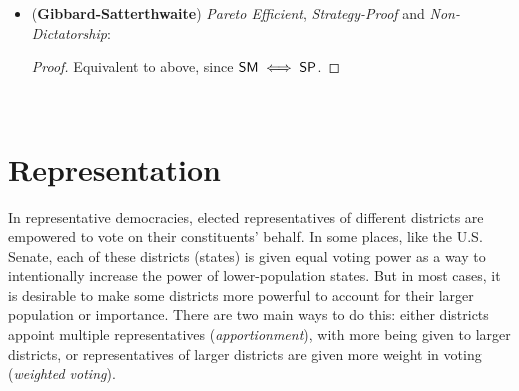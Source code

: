 \documentclass{amsart}
\DeclareMathOperator{\SP}{\sf{SP}}
\DeclareMathOperator{\SM}{\sf{SM}}
\begin{document}
\begin{itemize}
\begin{proof}
		Now using these consequences of $\SM$, we can establish dictatorship fairly easily: take a profile that is on the $(A,B)$-boundary for some $A,B$, and suppose that $v$ is a ballot which has a pivotal swap available. Then without making any swaps of $(A,B)$ one can elevate another candidate $C$ to the top of every ballot other than $v$, leaving the profile still on the $(A,B)$-boundary. Then elevate $C$ in $v$ until it is between $A$ and $B$. This pushes the profile out of the $(A,B)$-boundary, but the winner is still $A$ because this is neutral to $A$. But now, $C$ is unanimously preferred to $B$, \textbf{not done}
		
	\end{proof}
	\item (\textbf{Gibbard-Satterthwaite}) \textit{Pareto Efficient}, \textit{Strategy-Proof} and \textit{Non-Dictatorship}:
	\begin{proof}
		Equivalent to above, since $\SM\iff \SP$.
	\end{proof}\\
\end{itemize}


\newpage 

\section{Representation}

In representative democracies, elected representatives of different districts are empowered to vote on their constituents' behalf. In some places, like the U.S. Senate, each of these districts (states) is given equal voting power as a way to intentionally increase the power of lower-population states. But in most cases, it is desirable to make some districts more powerful to account for their larger population or importance. There are two main ways to do this: either districts appoint multiple representatives (\textit{apportionment}), with more being given to larger districts, or representatives of larger districts are given more weight in voting (\textit{weighted voting}).\\
\end{document}
